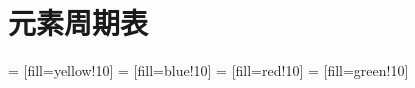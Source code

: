 \setlength{\defaultTopMargin}{\topmargin}

\section{元素周期表}
\newpage
{} %
\setlength{\topmargin}{-1in}

\newcommand{\NaturalElementTextFormat}[8]
{
	\begin{minipage}{2.21cm}
		\centering
		{\textbf{#1}\hfill \underline{{#7}} \hfill {#2}\textit{{#3}}}%
		\\[0.1cm]
		{\LARGE \textbf{{#5} {#8}}}
		\linebreak
		{\fontsize{8}{8}\selectfont {#6} }
		\linebreak
		{\tiny {#4}} 
	\end{minipage}
}

 = [fill=yellow!10]
 = [fill=blue!10]
 = [fill=red!10]
 = [fill=green!10]

